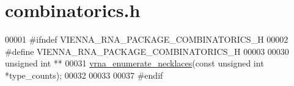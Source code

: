 \hypertarget{combinatorics_8h_source}{}\section{combinatorics.\+h}
\label{combinatorics_8h_source}

\begin{DoxyCode}
00001 \textcolor{preprocessor}{#ifndef VIENNA\_RNA\_PACKAGE\_COMBINATORICS\_H}
00002 \textcolor{preprocessor}{#define VIENNA\_RNA\_PACKAGE\_COMBINATORICS\_H}
00003 
00030 \textcolor{keywordtype}{unsigned} \textcolor{keywordtype}{int} **
00031 \mbox{\hyperlink{group__utils_gae081ac655a76bd5c4b3d86c60b096b75}{vrna\_enumerate\_necklaces}}(\textcolor{keyword}{const} \textcolor{keywordtype}{unsigned} \textcolor{keywordtype}{int} *type\_counts);
00032 
00033 
00037 \textcolor{preprocessor}{#endif}
\end{DoxyCode}
